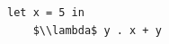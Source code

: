 \documentclass[border=10pt]{standalone}
\begin{document}
\begin{lstlisting}
let x = 5 in
    $\\lambda$ y . x + y
\end{lstlisting}
\end{document}
